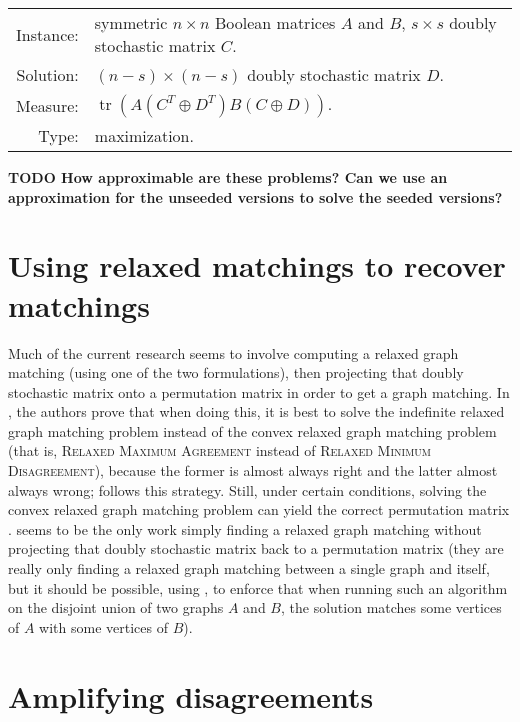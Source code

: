\documentclass{article}
\newcommand{\todo}[1]{\textbf{TODO #1}}
\newcommand{\1}{\mathbf{1}}
\newcommand{\RMD}{\textsc{Relaxed Minimum Disagreement}}
\newcommand{\RMA}{\textsc{Relaxed Maximum Agreement}}
\newcommand{\SRMA}{\textsc{Seeded Relaxed Maximum Agreement}}
\DeclareMathOperator{\tr}{tr}
\begin{document}
\begin{definition}[\SRMA{}]
  \mbox{}

  \begin{tabular}{r p{9.3cm}}
    Instance: & symmetric $n \times n$ Boolean matrices $A$ and $B$, $s \times s$ doubly stochastic matrix $C$. \\
    Solution: & $(n - s) \times (n - s)$ doubly stochastic matrix $D$. \\
    Measure: & $\tr(A (C^T \oplus D^T) B (C \oplus D))$. \\
    Type: & maximization.
  \end{tabular}
\end{definition}

\todo{
  How approximable are these problems?
  Can we use an approximation for the unseeded versions to solve the seeded versions?
}

\section{Using relaxed matchings to recover matchings}

Much of the current research seems to involve computing a relaxed graph matching (using one of the two formulations), then projecting that doubly stochastic matrix onto a permutation matrix in order to get a graph matching.
In \autocite{relax14}, the authors prove that when doing this, it is best to solve the indefinite relaxed graph matching problem instead of the convex relaxed graph matching problem (that is, \RMA{} instead of \RMD{}), because the former is almost always right and the latter almost always wrong; \autocite{v14} follows this strategy.
Still, under certain conditions, solving the convex relaxed graph matching problem can yield the correct permutation matrix \autocite{abk14, fs14}.
\autocite{kmgg14} seems to be the only work simply finding a relaxed graph matching without projecting that doubly stochastic matrix back to a permutation matrix (they are really only finding a relaxed graph matching between a single graph and itself, but it should be possible, using \autocite{gkms14}, to enforce that when running such an algorithm on the disjoint union of two graphs $A$ and $B$, the solution matches some vertices of $A$ with some vertices of $B$).

\section{Amplifying disagreements}
\end{document}
